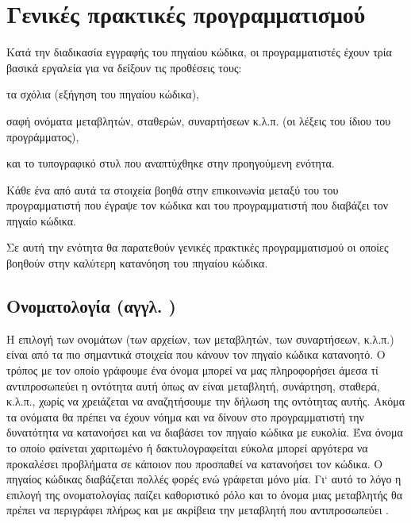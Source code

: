 \section{Γενικές πρακτικές προγραμματισμού}


Κατά την διαδικασία εγγραφής του πηγαίου κώδικα, οι προγραμματιστές έχουν τρία βασικά εργαλεία για να δείξουν τις προθέσεις τους:
\begin{inparaenum}[(i)]
\item τα σχόλια (εξήγηση του πηγαίου κώδικα),
\item σαφή ονόματα μεταβλητών, σταθερών, συναρτήσεων κ.λ.π. (οι λέξεις του ίδιου του προγράμματος),
\item και το τυπογραφικό στυλ που αναπτύχθηκε στην προηγούμενη ενότητα.
\end{inparaenum}
Κάθε ένα από αυτά τα στοιχεία βοηθά στην επικοινωνία μεταξύ του του προγραμματιστή που έγραψε τον κώδικα και του προγραμματιστή που διαβάζει τον πηγαίο κώδικα.

Σε αυτή την ενότητα θα παρατεθούν γενικές πρακτικές προγραμματισμού οι οποίες βοηθούν στην καλύτερη κατανόηση του πηγαίου κώδικα. %

\subsection{Ονοματολογία (αγγλ. )}

Η επιλογή των ονομάτων (των αρχείων, των μεταβλητών, των συναρτήσεων, κ.λ.π.) είναι από τα πιο σημαντικά στοιχεία που κάνουν τον πηγαίο κώδικα κατανοητό. Ο τρόπος με τον οποίο γράφουμε ένα όνομα μπορεί να μας πληροφορήσει άμεσα τί αντιπροσωπεύει η οντότητα αυτή όπως αν είναι μεταβλητή, συνάρτηση, σταθερά, κ.λ.π., χωρίς να χρειάζεται να αναζητήσουμε την δήλωση της οντότητας αυτής. Ακόμα τα ονόματα θα πρέπει να έχουν νόημα και να δίνουν στο προγραμματιστή την δυνατότητα να κατανοήσει και να διαβάσει τον πηγαίο κώδικα με ευκολία. Ένα όνομα το οποίο φαίνεται χαριτωμένο ή δακτυλογραφείται εύκολα μπορεί αργότερα να προκαλέσει προβλήματα σε κάποιον που προσπαθεί να κατανοήσει τον κώδικα. Ο πηγαίος κώδικας διαβάζεται πολλές φορές ενώ γράφεται μόνο μία. Γι` αυτό το λόγο η επιλογή της ονοματολογίας παίζει καθοριστικό ρόλο και το όνομα μιας μεταβλητής θα πρέπει να περιγράφει πλήρως και με ακρίβεια την μεταβλητή που αντιπροσωπεύει \cite{site:fx_alpha,site:taligent,site:google_style}.

